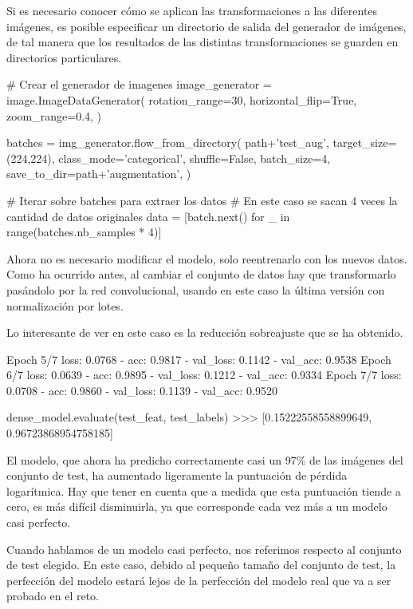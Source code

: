 Si es necesario conocer cómo se aplican las transformaciones a las diferentes imágenes, es posible especificar un directorio de salida del generador de imágenes, de tal manera que los resultados de las distintas transformaciones se guarden en directorios particulares.

\begin{python}
# Crear el generador de imagenes
image_generator = image.ImageDataGenerator(
    rotation_range=30,
    horizontal_flip=True,
    zoom_range=0.4,
)

batches = img_generator.flow_from_directory(
    path+'test_aug',
    target_size=(224,224),
    class_mode='categorical',
    shuffle=False,
    batch_size=4,
    save_to_dir=path+'augmentation',
)

# Iterar sobre batches para extraer los datos
# En este caso se sacan 4 veces la cantidad de datos originales
data = [batch.next() for _ in range(batches.nb_samples * 4)]
\end{python}

Ahora no es necesario modificar el modelo, solo reentrenarlo con los nuevos datos. Como ha ocurrido antes, al cambiar el conjunto de datos hay que transformarlo pasándolo por la red convolucional, usando en este caso la última versión con normalización por lotes.

Lo interesante de ver en este caso es la reducción sobreajuste que se ha obtenido.

\begin{python}
Epoch 5/7
loss: 0.0768 - acc: 0.9817 - val_loss: 0.1142 - val_acc: 0.9538
Epoch 6/7
loss: 0.0639 - acc: 0.9895 - val_loss: 0.1212 - val_acc: 0.9334
Epoch 7/7
loss: 0.0708 - acc: 0.9860 - val_loss: 0.1139 - val_acc: 0.9520

dense_model.evaluate(test_feat, test_labels)
>>> [0.15222558558899649, 0.96723868954758185]
\end{python}

El modelo, que ahora ha predicho correctamente casi un 97\% de las imágenes del conjunto de test, ha aumentado ligeramente la puntuación de pérdida logarítmica. Hay que tener en cuenta que a medida que esta puntuación tiende a cero, es más difícil disminuirla, ya que corresponde cada vez más a un modelo casi perfecto.

Cuando hablamos de un modelo casi perfecto, nos referimos respecto al conjunto de test elegido. En este caso, debido al pequeño tamaño del conjunto de test, la perfección del modelo estará lejos de la perfección del modelo real que va a ser probado en el reto.


